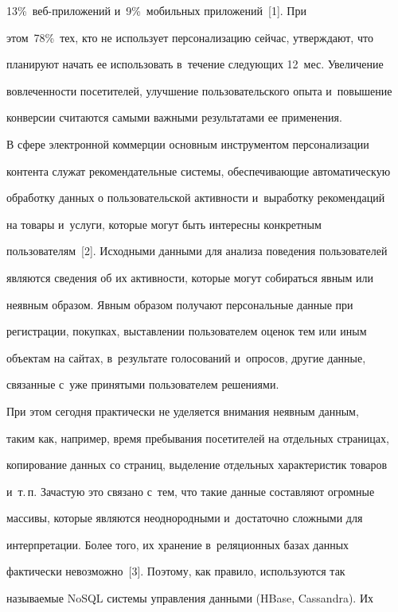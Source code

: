 13\%~веб-при\-ло\-же\-ний и~9\%~мобильных приложений~[1]. При 


этом~78\%~тех, кто не использует персонализацию сейчас, утверждают, что 


планируют начать ее использовать в~течение следующих 12~мес. Увеличение 


вовлеченности посетителей, улучшение пользовательского опыта и~повышение 


конверсии считаются самыми важными результатами ее применения. 


  


  В сфере электронной коммерции основным инструментом персонализации 


контента служат рекомендательные системы, обеспечивающие автоматическую 


обработку данных о пользовательской активности и~выработку рекомендаций 


на товары и~услуги, которые могут быть интересны конкретным 


пользователям~[2]. Исходными данными для анализа поведения пользователей 


являются сведения об их активности, которые могут собираться явным или 


неявным образом. Явным образом получают персональные данные при 


регистрации, покупках, вы\-став\-ле\-нии пользователем оценок тем или иным 


объектам на сайтах, в~результате голосований и~опросов, другие данные, 


связанные с~уже принятыми пользователем решениями. 




  При этом сегодня практически не уделяется внимания неявным данным, 


таким как, например, время пребывания посетителей на отдельных страницах, 


копирование данных со страниц, выделение отдельных характеристик товаров 


и~т.\,п. Зачастую это связано с~тем, что такие данные составляют огромные 


массивы, которые являются неоднородными и~достаточно сложными для 


интерпретации. Более того, их хранение в~реляционных базах данных 


фактически невозможно~[3]. Поэтому, как правило, используются так 


называемые NoSQL системы управления данными (HBase, Cassandra). Их 


